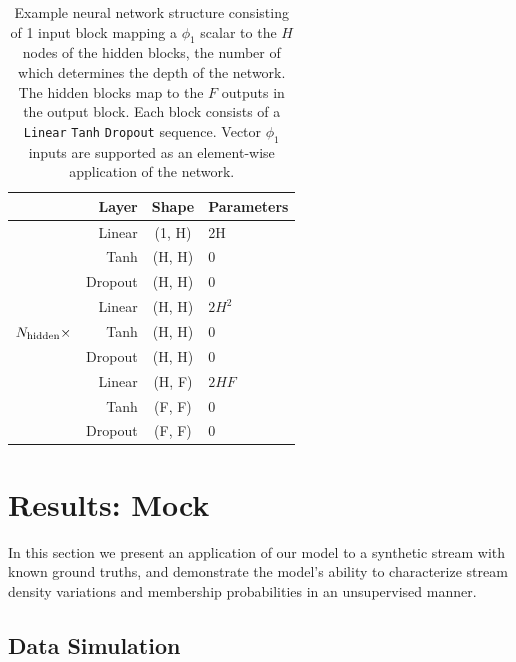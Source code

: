 \documentclass[twocolumn]{aastex631}
\begin{document}
        \begin{table}
            \centering
            \caption{%
            Example neural network structure consisting of 1 input block mapping
            a $\phi_1$ scalar to the $H$ nodes of the hidden blocks, the number
            of which determines the depth of the network. The hidden blocks map
            to the $F$ outputs in the output block. Each block consists of a
            \texttt{Linear} \!\!\textrightarrow \texttt{Tanh}
            \!\!\textrightarrow \texttt{Dropout} sequence. Vector $\phi_1$
            inputs are supported as an element-wise application of the network.
            }
            \label{table:mlp_structure}
            \begin{tabular}{@{}rrcl@{}}
            \toprule
            & Layer & Shape & Parameters \\
            \midrule
            & Linear & (1, H) & 2H  \\
            & Tanh & (H, H) & 0  \\
            & Dropout & (H, H) & 0  \\
            \hline
            & Linear & (H, H) & $2H^2$  \\
            $N_{\rm hidden} \times$ & Tanh & (H, H) & 0  \\
            & Dropout & (H, H) & 0  \\
            \hline
            & Linear & (H, F) & $2HF$  \\
            & Tanh & (F, F) & 0 \\
            & Dropout & (F, F) & 0  \\
            \bottomrule
            \end{tabular}
        \end{table}

        

\section{Results: Mock} \label{sec:results_mock}

    In this section we present an application of our model to a synthetic stream
    with known ground truths, and demonstrate the model's ability to
    characterize stream density variations and membership probabilities in an
    unsupervised manner.

    \subsection{Data Simulation} \label{sub:results_mock:data}
\end{document}
